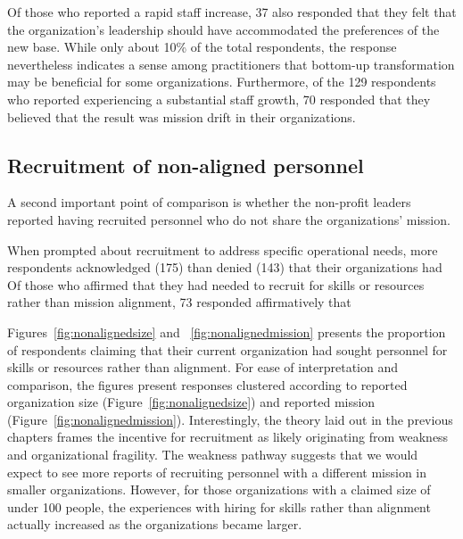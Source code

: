 Of those who reported a rapid staff increase, 37 also responded that they felt that the organization's leadership should have accommodated the preferences of the new base. While only about 10\% of the total respondents, the response nevertheless indicates a sense among practitioners that bottom-up transformation may be beneficial for some organizations. Furthermore, of the 129 respondents who reported experiencing a substantial staff growth, 70 responded that they believed that the result was mission drift in their organizations. 

\subsection{Recruitment of non-aligned personnel}

A second important point of comparison is whether the non-profit leaders reported having recruited personnel who do not share the organizations' mission.

When prompted about recruitment to address specific operational needs, more respondents acknowledged (175) than denied (143) that their organizations had  Of those who affirmed that they had needed to recruit for skills or resources rather than mission alignment, 73 responded affirmatively that 

Figures~\ref{fig:nonalignedsize} and ~\ref{fig:nonalignedmission} presents the proportion of respondents claiming that their current organization had sought personnel for skills or resources rather than alignment. For ease of interpretation and comparison, the figures present responses clustered according to reported organization size (Figure~\ref{fig:nonalignedsize}) and reported mission (Figure~\ref{fig:nonalignedmission}). Interestingly, the theory laid out in the previous chapters frames the incentive for recruitment as likely originating from weakness and organizational fragility. The weakness pathway suggests that we would expect to see more reports of recruiting personnel with a different mission in smaller organizations. However, for those organizations with a claimed size of under 100 people, the experiences with hiring for skills rather than alignment actually increased as the organizations became larger.
 
